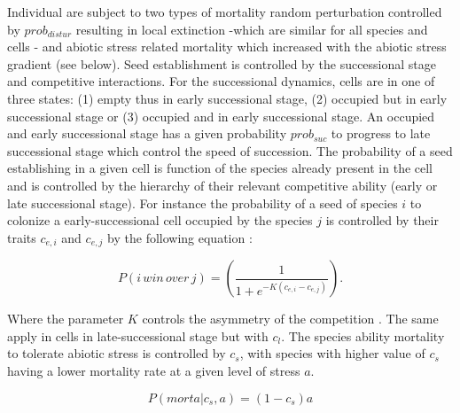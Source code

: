 \documentclass[a4paper,11pt]{article}
\begin{document}
Individual are subject to two
types of mortality random perturbation controlled by
$prob_{distur}$ resulting in local extinction -which are  similar for all
species  and cells - and  abiotic stress  related mortality which
increased with the abiotic stress gradient (see below). Seed
establishment is controlled by the successional stage and
competitive interactions. For the successional dynamics, cells
are in one of three states: (1) empty thus in early successional
stage, (2) occupied but in early successional stage or (3)
occupied and in early successional stage. An occupied and early
successional stage has a given probability $prob_{suc}$ to
progress to late successional stage which control the speed of
succession. The probability of a seed establishing in a given
cell is function of the species already present in the cell and
is controlled by the hierarchy of their relevant competitive
ability (early or late successional stage). For instance the
probability of a seed of species $i$ to colonize a
early-successional cell occupied by the species $j$  is
controlled by their traits $c_{e,i}$ and $c_{e,j}$ by the
following equation \citep[as in][]{Law-1997}:

\begin{equation}
\label{eq:Law}
P(i \, win \, over \, j)=\left(\frac{1}{1+e^{-K(c_{e,i}-c_{e,j})}}\right).
\end{equation}

Where the parameter $K$ controls the asymmetry of the competition
\citep[see][]{Law-1997,Calcagno-2006}. The same apply in cells in
late-successional stage but with $c_l$. The species ability
mortality to tolerate abiotic stress is controlled by $c_s$, with
species with higher value of $c_s$ having a lower mortality rate
at a given level of stress $a$.

\begin{equation}
\label{eq:MortaStress}
P(morta | c_s , a)= (1- c_s) a
\end{equation}
\end{document}
